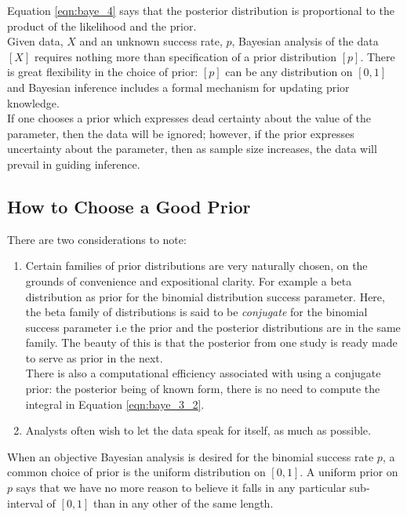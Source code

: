 \documentclass[12pt,oneside,a4paper]{book}
\theoremstyle{definition}
\theoremstyle{remark}
\begin{document}
				Equation \eqref{eqn:baye_4} says that the posterior distribution is proportional to the product of the likelihood and the prior.\\

				Given data, $X$ and an unknown success rate, $p$, Bayesian analysis of the data $[X]$ requires nothing more than specification of a prior distribution $[p]$. There is great flexibility in the choice of prior: $[p]$ can be any distribution on $[0, 1]$ and  Bayesian inference includes a formal mechanism for updating prior knowledge.\\

				If one chooses a prior which expresses dead certainty about the value of the parameter, then the data will be ignored; however, if the prior expresses uncertainty about the parameter, then as sample size increases, the data will prevail in guiding inference.

				\subsection{How to Choose a Good Prior}
				There are two considerations to note:
				\begin{enumerate}
					\item[(i.)] Certain families of prior distributions are very naturally chosen, on the grounds of convenience and expositional clarity. For example a beta distribution as prior for the binomial distribution success parameter. Here, the beta family of distributions is said to be \textit{conjugate} for the binomial success parameter i.e the prior and the posterior distributions are in the same family. The beauty of this is 		that the posterior from one study is ready made to serve as prior in the next.\\
					There is also a computational efficiency associated with using a conjugate prior: the posterior being of known form, there is no need to compute the integral in Equation \eqref{eqn:baye_3_2}.

					\item[(ii.)] Analysts often wish to let the data speak for itself, as much as possible.
				\end{enumerate}

				When an objective Bayesian analysis is desired for the binomial success rate $p$, a common choice of prior is the uniform distribution on $[0, 1]$. A uniform prior on $p$ says that we have no more reason to believe it falls in any particular sub-interval of $[0, 1]$ than in any other of the same length. \cite{link2009bayesian}
\end{document}
